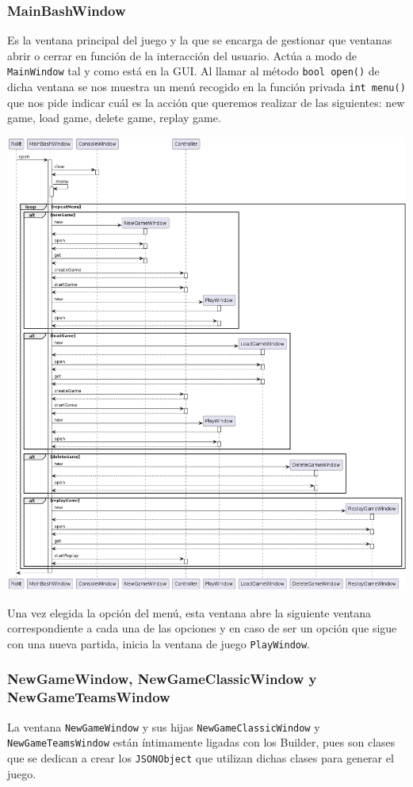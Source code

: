 \documentclass[../DocumentoOficial.tex]{subfiles}
\begin{document}
\subsubsection{MainBashWindow}
Es la ventana principal del juego y la que se encarga de gestionar que ventanas abrir o cerrar en función de la interacción del usuario. Actúa a modo de \texttt{MainWindow} tal y como está en la GUI. Al llamar al método \texttt{bool open()} de dicha ventana se nos muestra un menú recogido en la función privada \texttt{int menu()} que nos pide indicar cuál es la acción que queremos realizar de las siguientes: new game, load game, delete game, replay game.

\begin{center}
\includegraphics[scale=0.4]{MainBashWindow_final_seq}
\end{center}

Una vez elegida la opción del menú, esta ventana abre la siguiente ventana correspondiente a cada una de las opciones y en caso de ser un opción que sigue con una nueva partida, inicia la ventana de juego \texttt{PlayWindow}.

\subsubsection{NewGameWindow, NewGameClassicWindow y NewGameTeamsWindow}
La ventana \texttt{NewGameWindow} y sus hijas \texttt{NewGameClassicWindow} y \texttt{NewGameTeamsWindow} están íntimamente ligadas con los Builder, pues son clases que se dedican a crear los \texttt{JSONObject} que utilizan dichas clases para generar el juego.
\end{document}
